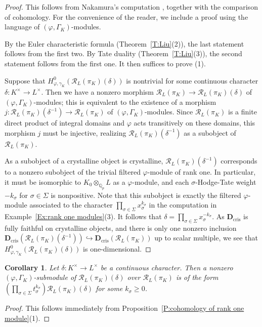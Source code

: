 \documentclass[12pt]{article}
\newtheorem{cor}[theorem]{Corollary}
\theoremstyle{definition}
\numberwithin{equation}{theorem}
\newcommand{\calR}{\mathcal{R}}
\newcommand{\QQ}{\mathbb{Q}}
\newcommand{\bbD}{\mathbf{D}}
\newcommand{\cris}{\mathrm{cris}}
\def\Qp{\QQ_p}
\begin{document}
\begin{proof}
This follows from Nakamura's computation \cite[\S2.3]{nakamura}, together with the comparison of cohomology.
For the convenience of the reader, we include a proof using the language of $(\varphi, \Gamma_K)$-modules.

By the Euler characteristic formula (Theorem~\ref{T:Liu}(2)), the last statement follows from the first two.  By Tate duality (Theorem~\ref{T:Liu}(3)), the second statement follows from the first one.  It then suffices to prove (1).

Suppose that $H^0_{\varphi, \gamma_K}(\calR_L(\pi_K)(\delta))$ is nontrivial for some continuous character $\delta: K^\times \to L^\times$.  Then we have a nonzero morphism $\calR_L(\pi_K) \to \calR_L(\pi_K)(\delta)$ of $(\varphi, \Gamma_K)$-modules; this is equivalent to the existence of a morphism $j: \calR_L(\pi_K)(\delta^{-1}) \to \calR_L(\pi_K)$ of $(\varphi, \Gamma_K)$-modules.  Since $\calR_L(\pi_K)$  is a finite direct product of integral domains and $\varphi$ acts transitively on these domains, this morphism $j$ must be injective, realizing $\calR_L(\pi_K)(\delta^{-1})$ as a subobject of $\calR_L(\pi_K)$.

As a subobject of a crystalline object is crystalline, $\calR_L(\pi_K)(\delta^{-1})$ corresponds to a nonzero subobject of the trivial filtered $\varphi$-module of rank one.  In particular, it must be isomorphic to $K_0 \otimes_{\Qp} L$ as a $\varphi$-module, and each $\sigma$-Hodge-Tate weight $-k_\sigma$ for $\sigma \in \Sigma$ is nonpositive.  Note that this subobject is exactly the filtered $\varphi$-module associated to the character $\prod_{\sigma \in \Sigma} x_\sigma^{k_\sigma}$ in the computation in Example~\ref{Ex:rank one modules}(3).  It follows that $\delta = \prod_{\sigma \in \Sigma} x_\sigma^{-k_\sigma}$.  As $\bbD_\cris$ is fully faithful on crystalline objects, and there is only one nonzero inclusion $\bbD_\cris(\calR_L(\pi_K)(\delta^{-1})) \hookrightarrow \bbD_\cris(\calR_L(\pi_K))$ up to scalar multiple, we see that $H^0_{\varphi,\gamma_K}(\calR_L(\pi_K)(\delta))$ is one-dimensional.
\end{proof}

\begin{cor}
\label{C:submodule of rank one module}
Let $\delta:K^\times \to L^\times$ be a continuous character.  Then a nonzero $(\varphi, \Gamma_K)$-submodule of $\calR_L(\pi_K)(\delta)$ over $\calR_L(\pi_K)$ is of the form $\left(\prod_{\sigma \in \Sigma} t_\sigma^{k_\sigma}\right) \calR_L(\pi_K)(\delta)$ for some $k_\sigma \geq 0$.
\end{cor}
\begin{proof}
This follows immediately from Proposition~\ref{P:cohomology of rank one module}(1).
\end{proof}
\end{document}
